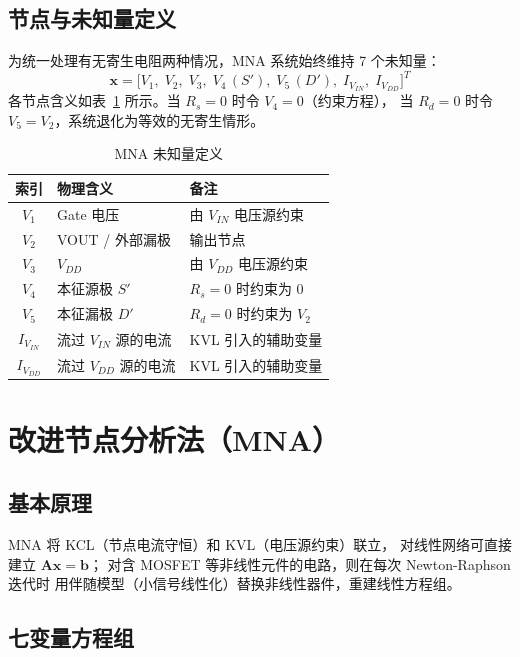 \documentclass[12pt, a4paper]{article}
\begin{document}
\subsection{节点与未知量定义}

为统一处理有无寄生电阻两种情况，MNA 系统始终维持 7 个未知量：
\[
  \bm{x} = \bigl[V_1,\; V_2,\; V_3,\; V_4\,(S'),\; V_5\,(D'),\; I_{V_{IN}},\; I_{V_{DD}}\bigr]^T
\]
各节点含义如表~\ref{tab:nodes} 所示。当 $R_s=0$ 时令 $V_4=0$（约束方程），
当 $R_d=0$ 时令 $V_5=V_2$，系统退化为等效的无寄生情形。

\begin{table}[H]
\centering
\caption{MNA 未知量定义}
\label{tab:nodes}
\begin{tabular}{cll}
\toprule
索引 & 物理含义 & 备注 \\
\midrule
$V_1$ & Gate 电压 & 由 $V_{IN}$ 电压源约束 \\
$V_2$ & VOUT / 外部漏极 & 输出节点 \\
$V_3$ & $V_{DD}$ & 由 $V_{DD}$ 电压源约束 \\
$V_4$ & 本征源极 $S'$ & $R_s=0$ 时约束为 $0$ \\
$V_5$ & 本征漏极 $D'$ & $R_d=0$ 时约束为 $V_2$ \\
$I_{V_{IN}}$ & 流过 $V_{IN}$ 源的电流 & KVL 引入的辅助变量 \\
$I_{V_{DD}}$ & 流过 $V_{DD}$ 源的电流 & KVL 引入的辅助变量 \\
\bottomrule
\end{tabular}
\end{table}

\section{改进节点分析法（MNA）}

\subsection{基本原理}

MNA 将 KCL（节点电流守恒）和 KVL（电压源约束）联立，
对线性网络可直接建立 $\bm{A}\bm{x}=\bm{b}$；
对含 MOSFET 等非线性元件的电路，则在每次 Newton-Raphson 迭代时
用伴随模型（小信号线性化）替换非线性器件，重建线性方程组。

\subsection{七变量方程组}
\end{document}
